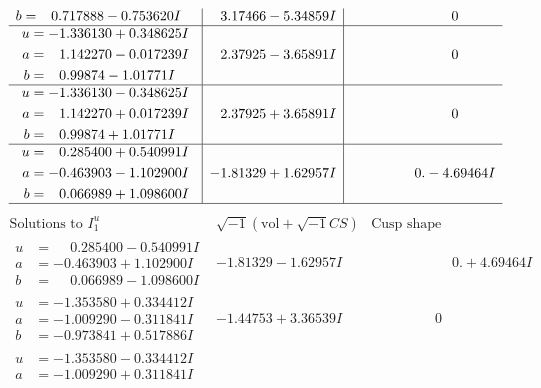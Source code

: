 \documentclass[1p]{elsarticle_modified}
\theoremstyle{definition}
\newcommand{\I}{\sqrt{-1}}
\begin{document}
$$\begin{array}{c|c|c}
\begin{aligned}
b &= \phantom{-}0.717888 - 0.753620 I\end{aligned}
 & \phantom{-}3.17466 - 5.34859 I & \phantom{-0.000000 } 0 \\ \hline\begin{aligned}
u &= -1.336130 + 0.348625 I \\
a &= \phantom{-}1.142270 - 0.017239 I \\
b &= \phantom{-}0.99874 - 1.01771 I\end{aligned}
 & \phantom{-}2.37925 - 3.65891 I & \phantom{-0.000000 } 0 \\ \hline\begin{aligned}
u &= -1.336130 - 0.348625 I \\
a &= \phantom{-}1.142270 + 0.017239 I \\
b &= \phantom{-}0.99874 + 1.01771 I\end{aligned}
 & \phantom{-}2.37925 + 3.65891 I & \phantom{-0.000000 } 0 \\ \hline\begin{aligned}
u &= \phantom{-}0.285400 + 0.540991 I \\
a &= -0.463903 - 1.102900 I \\
b &= \phantom{-}0.066989 + 1.098600 I\end{aligned}
 & -1.81329 + 1.62957 I & \phantom{-0.000000 } 0. - 4.69464 I\\
 \hline 
 \end{array}$$\newpage$$\begin{array}{c|c|c}  
\text{Solutions to }I^u_{1}& \I (\text{vol} + \sqrt{-1}CS) & \text{Cusp shape}\\
 \hline 
\begin{aligned}
u &= \phantom{-}0.285400 - 0.540991 I \\
a &= -0.463903 + 1.102900 I \\
b &= \phantom{-}0.066989 - 1.098600 I\end{aligned}
 & -1.81329 - 1.62957 I & \phantom{-0.000000 -}0. + 4.69464 I \\ \hline\begin{aligned}
u &= -1.353580 + 0.334412 I \\
a &= -1.009290 - 0.311841 I \\
b &= -0.973841 + 0.517886 I\end{aligned}
 & -1.44753 + 3.36539 I & \phantom{-0.000000 } 0 \\ \hline\begin{aligned}
u &= -1.353580 - 0.334412 I \\
a &= -1.009290 + 0.311841 I \\

\end{aligned}
\end{array}$$
\end{document}
